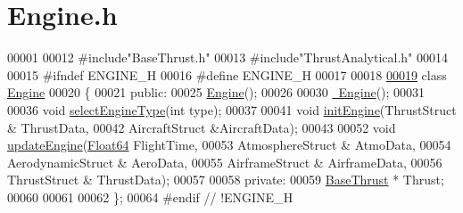 \hypertarget{_engine_8h_source}{}\section{Engine.\+h}
\label{_engine_8h_source}

\begin{DoxyCode}
00001 
00012 \textcolor{preprocessor}{#include"BaseThrust.h"}
00013 \textcolor{preprocessor}{#include"ThrustAnalytical.h"}
00014 
00015 \textcolor{preprocessor}{#ifndef ENGINE\_H}
00016 \textcolor{preprocessor}{#define ENGINE\_H}
00017 
00018 
\hyperlink{group___engine}{00019} \textcolor{keyword}{class }\hyperlink{group___engine_class_engine}{Engine}
00020 \{
00021 \textcolor{keyword}{public}:
00025     \hyperlink{group___engine_a8c98683b0a3aa28d8ab72a8bcd0d52f2}{Engine}();
00026 
00030     \hyperlink{group___engine_a8ef7030a089ecb30bbfcb9e43094717a}{~Engine}();
00031 
00036     \textcolor{keywordtype}{void} \hyperlink{group___engine_ac33371d6fff86c0c8e14495f10046d9a}{selectEngineType}(\textcolor{keywordtype}{int} type);
00037 
00041     \textcolor{keywordtype}{void} \hyperlink{group___engine_aee607dba02101af5b299920f89b56e79}{initEngine}(ThrustStruct & ThrustData,
00042                     AircraftStruct &AircraftData);
00043 
00052     \textcolor{keywordtype}{void} \hyperlink{group___engine_a9e16100ffd33cf8ec632257795c03865}{updateEngine}(\hyperlink{group___tools_ga3f1431cb9f76da10f59246d1d743dc2c}{Float64} FlightTime,
00053                         AtmosphereStruct & AtmoData,
00054                         AerodynamicStruct & AeroData,
00055                         AirframeStruct & AirframeData,
00056                         ThrustStruct & ThrustData);
00057 
00058 \textcolor{keyword}{private}:
00059     \hyperlink{group___engine_class_base_thrust}{BaseThrust} * Thrust;
00060 
00061 
00062 \};
00064 \textcolor{preprocessor}{#endif // !ENGINE\_H}
\end{DoxyCode}
